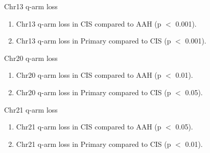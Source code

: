 \documentclass{beamer}
\begin{document}
\begin{frame}[allowframebreaks]
        \begin{block}{Chr13 q-arm loss}
            \begin{enumerate}
                \item Chr13 q-arm loss in CIS compared to AAH (p $<$ 0.001).
                \item Chr13 q-arm loss in Primary compared to CIS (p $<$ 0.001).
            \end{enumerate}

            \begin{table}
                \caption{CGC Tier1 genes in Chr13 q-arm}
                \resizebox{\linewidth}{!}
                {}
            \end{table}
        \end{block}

        \begin{block}{Chr20 q-arm loss}
            \begin{enumerate}
                \item Chr20 q-arm loss in CIS compared to AAH (p $<$ 0.01).
                \item Chr20 q-arm loss in Primary compared to CIS (p $<$ 0.05).
            \end{enumerate}

            \begin{table}
                \caption{CGC Tier1 genes in Chr20 q-arm}
                \resizebox{\linewidth}{!}
                {}
            \end{table}
        \end{block}

        \begin{block}{Chr21 q-arm loss}
            \begin{enumerate}
                \item Chr21 q-arm loss in CIS compared to AAH (p $<$ 0.05).
                \item Chr21 q-arm loss in Primary compared to CIS (p $<$ 0.01).
            \end{enumerate}

            \begin{table}
                \caption{CGC Tier1 genes in Chr21 q-arm}
                \resizebox{\linewidth}{!}
                {}
            \end{table}
        \end{block}
    \end{frame}
\end{document}
